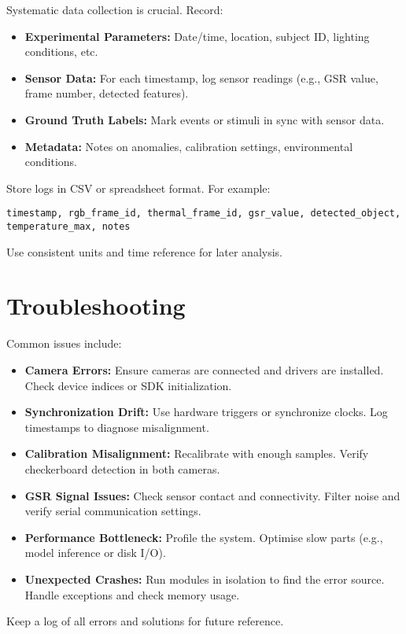 \documentclass{article}
\begin{document}
    Systematic data collection is crucial. Record:
    \begin{itemize}
        \item \textbf{Experimental Parameters:} Date/time, location, subject ID, lighting conditions, etc.
        \item \textbf{Sensor Data:} For each timestamp, log sensor readings (e.g., GSR value, frame number, detected features).
        \item \textbf{Ground Truth Labels:} Mark events or stimuli in sync with sensor data.
        \item \textbf{Metadata:} Notes on anomalies, calibration settings, environmental conditions.
    \end{itemize}
    Store logs in CSV or spreadsheet format. For example:
    \begin{verbatim}
timestamp, rgb_frame_id, thermal_frame_id, gsr_value, detected_object, temperature_max, notes
    \end{verbatim}
    Use consistent units and time reference for later analysis.


    \section{Troubleshooting}

    Common issues include:
    \begin{itemize}
        \item \textbf{Camera Errors:} Ensure cameras are connected and drivers are installed. Check device indices or SDK initialization.
        \item \textbf{Synchronization Drift:} Use hardware triggers or synchronize clocks. Log timestamps to diagnose misalignment.
        \item \textbf{Calibration Misalignment:} Recalibrate with enough samples. Verify checkerboard detection in both cameras.
        \item \textbf{GSR Signal Issues:} Check sensor contact and connectivity. Filter noise and verify serial communication settings.
        \item \textbf{Performance Bottleneck:} Profile the system. Optimise slow parts (e.g., model inference or disk I/O).
        \item \textbf{Unexpected Crashes:} Run modules in isolation to find the error source. Handle exceptions and check memory usage.
    \end{itemize}
    Keep a log of all errors and solutions for future reference.
\end{document}
